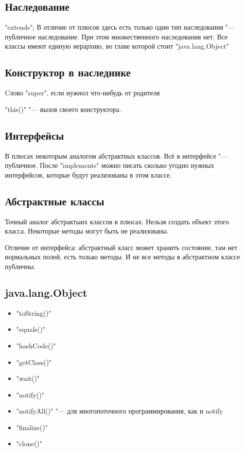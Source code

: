 \subsection{Наследование}
\java"extends";
В отличие от плюсов здесь есть только один тип наследования "--- публичное наследование.
При этом множественного наследования нет.
Все классы имеют единую иерархию, во главе которой стоит \java"java.lang.Object"

\subsection{Конструктор в наследнике}
Cлово \java"super", если нужнол что-нибудь от родителя

\java"this()" "--- вызов своего конструктора.

\subsection{Интерфейсы}
В плюсах некоторым аналогом абстрактных классов.
Всё в интерфейсе "--- публичное.
После \java"implements" можно писать сколько угодно нужных интерфейсов, которые будут реализованы в этом классе.

\subsection{Абстрактные классы}
Точный аналог абстрактынх классов в плюсах.
Нельзя создать объект этого класса.
Некоторые методы могут быть не реализованы.

Отличие от интерфейса: абстрактный класс может хранить состояние, там нет нормальных полей, есть только методы.
И не все методы в абстрактном классе публичны.

\subsection{java.lang.Object}
\begin{itemize}
	\item
		\java"toString()"
	\item
		\java"equals()"
	\item
		\java"hashCode()"
	\item
		\java"getClass()"
	\item
		\java"wait()"
	\item
		\java"notify()"
	\item
		\java"notifyAll()" "--- для многопоточного программирования, как и notify
	\item
		\java"finalize()"
	\item
		\java"clone()"

\end{itemize}


